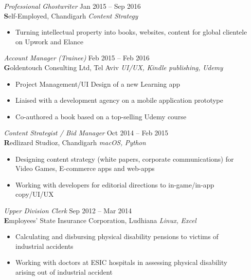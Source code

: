 \documentclass[margin, 10pt]{res} %
\begin{document}
\begin{resume}
\begin{itemize}
\end{itemize}

{\sl Professional Ghostwriter} \hfill Jan 2015 – Sep 2016 \\
\textbf Self-Employed, Chandigarh \hfill {\scriptsize \it Content Strategy}
\begin{itemize}\smallskip\smallskip
\item Turning intellectual property into books, websites, content for global clientele on Upwork and Elance
\end{itemize}

{\sl Account Manager (Trainee)} \hfill Feb 2015 – Feb 2016 \\
\textbf Goldentouch Consulting Ltd, Tel Aviv \hfill {\scriptsize \it UI/UX, Kindle publishing, Udemy} 
\begin{itemize}\smallskip\smallskip
\item Project Management/UI Design of a new Learning app
\item Liaised with a development agency on a mobile application prototype
\item Co-authored a book based on a top-selling Udemy course
\end{itemize}

{\sl Content Strategist / Bid Manager} \hfill Oct 2014 – Feb 2015 \\
\textbf Redlizard Studioz, Chandigarh \hfill {\scriptsize \it macOS, Python}
\begin{itemize}\smallskip\smallskip
\item Designing content strategy (white papers, corporate communications) for Video Games, E-commerce apps and web-apps
\item Working with developers for editorial directions to in-game/in-app copy/UI/UX
\end{itemize}

{\sl Upper Division Clerk} \hfill Sep 2012 – Mar 2014 \\
\textbf Employees' State Insurance Corporation, Ludhiana \hfill {\scriptsize \it Linux, Excel}
\begin{itemize}\smallskip\smallskip
\item Calculating and disbursing physical disability pensions to victims of industrial accidents
\item Working with doctors at ESIC hospitals in assessing physical disability arising out of industrial accident 
\end{itemize} 


\end{resume}
\end{document}

